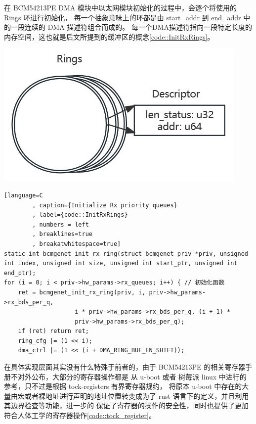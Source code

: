     \begin{adjustwidth}{0cm}{} %
    \begin{minipage}[b]{0.5\linewidth}
        \setlength{\parindent}{2em} %
        在 BCM54213PE DMA 模块中以太网模块初始化的过程中，会逐个将使用的 Rings 环进行初始化，
        每一个抽象意味上的环都是由 start\_addr 到 end\_addr 中的一段连续的 DMA 描述符组合而成的。
        每一个DMA描述符指向一段特定长度的内存空间，这也就是后文所提到的缓冲区的概念\ref{code::InitRxRings}。

    \end{minipage}
    \hfill
    \begin{minipage}[b]{0.45\linewidth}
        \includegraphics[scale=0.6]{./imgs/Rings_and_Descs.jpg}        
         \label{pict:DmaDescAndLoop}
    \end{minipage}
    \end{adjustwidth}

    \begin{lstlisting}[language=C
        , caption={Initialize Rx priority queues}
        , label={code::InitRxRings}
        , numbers = left
        , breaklines=true
        , breakatwhitespace=true]
static int bcmgenet_init_rx_ring(struct bcmgenet_priv *priv, unsigned int index, unsigned int size, unsigned int start_ptr, unsigned int end_ptr);
for (i = 0; i < priv->hw_params->rx_queues; i++) { // 初始化函数
    ret = bcmgenet_init_rx_ring(priv, i, priv->hw_params->rx_bds_per_q,
                    i * priv->hw_params->rx_bds_per_q, (i + 1) *
                    priv->hw_params->rx_bds_per_q);
    if (ret) return ret;
    ring_cfg |= (1 << i);
    dma_ctrl |= (1 << (i + DMA_RING_BUF_EN_SHIFT));
    \end{lstlisting}

    
    在具体实现层面其实没有什么特殊于前者的，由于 BCM54213PE 的相关寄存器手册不对外公布，大部分的寄存器操作都是
    从 u-boot 或者 树莓派 linux 中进行的参考，只不过是根据 tock-registers 有界寄存器规约，
    将原本 u-boot 中存在的大量由宏或者裸地址进行声明的地址位置转变成为了 rust 语言下的定义，并且利用其边界检查等功能，进一步的
    保证了寄存器的操作的安全性，同时也提供了更加符合人体工学的寄存器操作\ref{code::tock_register}。

